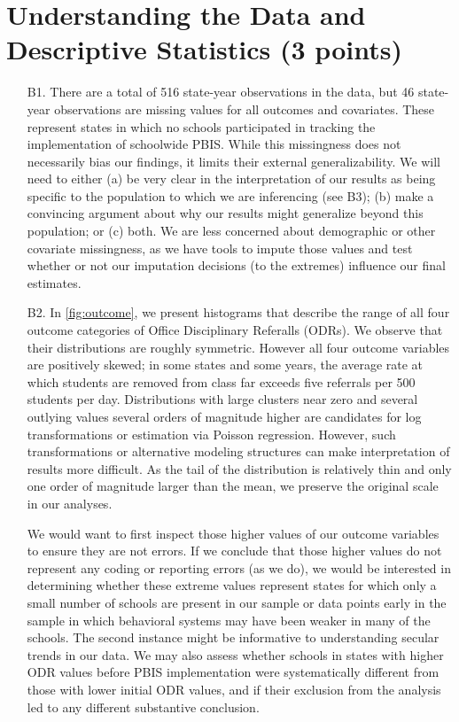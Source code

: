 \documentclass[a4paper, 11pt]{article}
\begin{document}
\section{Understanding the Data and Descriptive Statistics (3 points)}
\begin{enumerate}
	\item[B1.] There are a total of 516 state-year observations in the data, but 46 state-year observations are missing values for all outcomes and covariates. These represent states in which no schools participated in tracking the implementation of schoolwide PBIS. While this missingness does not necessarily bias our findings, it limits their external generalizability. We will need to either (a) be very clear in the interpretation of our results as being specific to the population to which we are inferencing (see B3); (b) make a convincing argument about why our results might generalize beyond this population; or (c) both. We are less concerned about demographic or other covariate missingness, as we have tools to impute those values and test whether or not our imputation decisions (to the extremes) influence our final estimates. 
	
	\item [B2.] In \autoref{fig:outcome}, we present histograms that describe the range of all four outcome categories of Office Disciplinary Referalls (ODRs). We observe that their distributions are roughly symmetric. However all four outcome variables are positively skewed; in some states and some years, the average rate at which students are removed from class far exceeds five referrals per 500 students per day. Distributions with large clusters near zero and several outlying values several orders of magnitude higher are candidates for log transformations or estimation via Poisson regression. However, such transformations or alternative modeling structures can make interpretation of results more difficult. As the tail of the distribution is relatively thin and only one order of magnitude larger than the mean, we preserve the original scale in our analyses.

	We would want to first inspect those higher values of our outcome variables to ensure they are not errors. If we conclude that those higher values do not represent any coding or reporting errors (as we do), we would be interested in determining whether these extreme values represent states for which only a small number of schools are present in our sample or data points early in the sample in which behavioral systems may have been weaker in many of the schools. The second instance might be informative to understanding secular trends in our data. We may also assess whether schools in states with higher ODR values before PBIS implementation were systematically different from those with lower initial ODR values, and if their exclusion from the analysis led to any different substantive conclusion. 


\end{enumerate}
\end{document}
